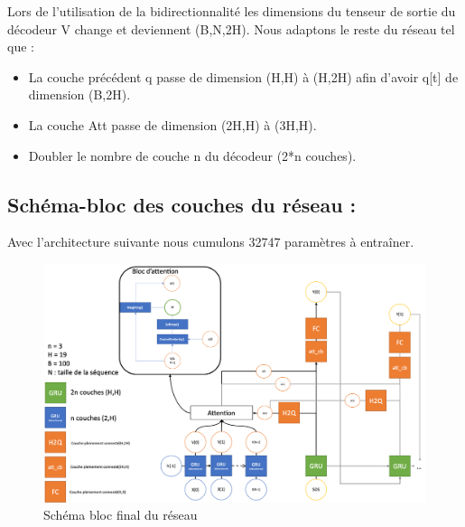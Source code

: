         Lors de l'utilisation de la bidirectionnalité les dimensions du tenseur de sortie du décodeur V change et deviennent (B,N,2H). Nous adaptons le reste du réseau tel que :
        \begin{itemize}
            \item La couche précédent q passe de dimension (H,H) à (H,2H) afin d'avoir q[t] de dimension (B,2H).
            \item La couche Att passe de dimension (2H,H) à (3H,H).
            \item Doubler le nombre de couche n du décodeur (2*n couches).
        \end{itemize}
\newpage
\subsection{Schéma-bloc des couches du réseau :}
    
    Avec l'architecture suivante nous cumulons 32747 paramètres à entraîner.
    
    \begin{figure}[!ht]
            \centering
            \includegraphics[width=150mm]{sections/images/architecture/schameBloc.png}
            \caption{Schéma bloc final du réseau}
            \label{fig:Figure 9  }
        \end{figure}
    
    
    
